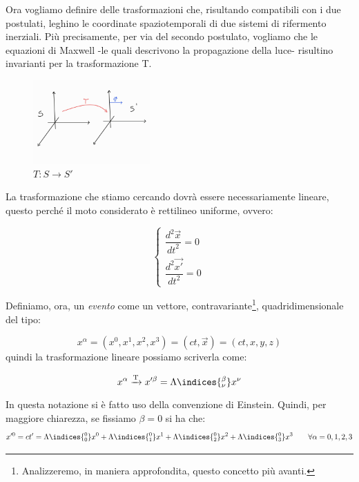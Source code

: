 Ora vogliamo definire delle trasformazioni che, risultando compatibili con i due postulati, leghino le coordinate spaziotemporali di due sistemi di rifermento inerziali.
Più precisamente, per via del secondo postulato, vogliamo che le equazioni di Maxwell -le quali descrivono la propagazione della luce- risultino invarianti per la trasformazione T.

\begin{figure}[h]
    \centering
    \includegraphics[width=0.40\textwidth]{Immagini/Tras_Lorentz.jpg}
    \caption{ $T : S \rightarrow{} S'$}
    \label{fig:TL}
\end{figure}
La trasformazione che stiamo cercando dovrà essere necessariamente lineare, questo perché il moto considerato è rettilineo uniforme, ovvero:

\begin{equation}
    \begin{cases}
      \dfrac{d^2\vec{x}}{{dt}^2}=0
             \\
     \dfrac{d^2\Vec{x'}}{{dt}^2}=0
    \end{cases}\,
\end{equation}

Definiamo, ora, un \textit{evento} come un vettore, contravariante\footnote{Analizzeremo, in maniera approfondita, questo concetto più avanti.}, quadridimensionale del tipo:

\begin{equation}\label{eq:def_evento}
  x^{\alpha}=(x^0,x^1,x^2,x^3)=(ct, \Vec{x})=(ct,x,y,z)
\end{equation}
quindi la trasformazione lineare possiamo scriverla come:


\begin{equation}
  x^{\alpha}\xrightarrow[\text{}]{\text{T}}x'^{\beta}=\Lambda\indices{^\beta_\nu} x^{\nu}
\end{equation}
In questa notazione si è fatto uso della convenzione di Einstein. Quindi, per maggiore chiarezza, se fissiamo $ \beta=0 $ si ha che:
\begin{equation*}
  x'^{0}=ct'=\Lambda\indices{^0_0}x^0+\Lambda\indices{^0_1}x^1+\Lambda\indices{^0_2}x^2+\Lambda\indices{^0_3}x^3     \qquad   \forall\alpha=0,1,2,3
\end{equation*}

